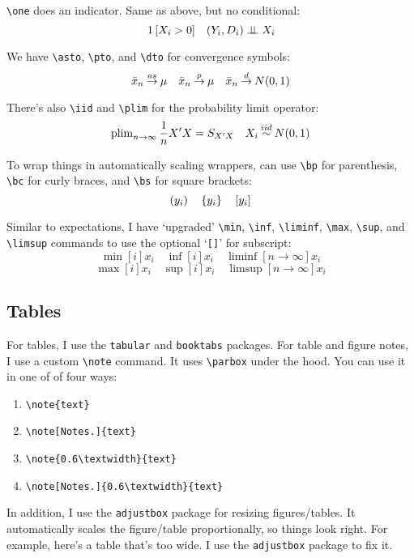\documentclass[12pt]{article}
\begin{document}
\texttt{\textbackslash one} does an indicator. Same as above, but no conditional:
$$\one{X_i > 0} \quad (Y_i, D_i) \indep X_i$$

We have \texttt{\textbackslash asto}, \texttt{\textbackslash pto}, and \texttt{\textbackslash dto} for convergence symbols:
$$\bar{x}_n \mathbin{\overset{as}{\to}} \mu \quad \bar{x}_n \mathbin{\overset{p}{\to}} \mu \quad \bar{x}_n \mathbin{\overset{d}{\to}} N(0, 1)$$

There's also \texttt{\textbackslash iid} and \texttt{\textbackslash plim} for the probability limit operator:
$$\operatorname{plim}_{n\to \infty} \frac{1}{n} X' X = S_{X'X} \quad X_i \mathbin{\overset{iid}{\sim}} N(0, 1)$$

To wrap things in automatically scaling wrappers, can use \texttt{\textbackslash bp} for parenthesis, \texttt{\textbackslash bc} for curly braces, and \texttt{\textbackslash bs} for square brackets:
$$\left( y_i \right) \quad \left\lbrace y_i \right\rbrace \quad \left[ y_i \right]$$

Similar to expectations, I have `upgraded' \texttt{\textbackslash min}, \texttt{\textbackslash inf}, \texttt{\textbackslash liminf}, \texttt{\textbackslash max}, \texttt{\textbackslash sup}, and \texttt{\textbackslash limsup} commands to use the optional `\texttt{[]}' for subscript:
$$\min[i]{x_i} \quad \inf[i]{x_i} \quad \liminf[n \to \infty]{x_i}$$
$$\max[i]{x_i} \quad \sup[i]{x_i} \quad \limsup[n \to \infty]{x_i}$$


\subsection{Tables}

For tables, I use the \texttt{tabular} and \texttt{booktabs} packages. For table and figure notes, I use a custom \texttt{\textbackslash note} command. It uses \texttt{\textbackslash parbox} under the hood. You can use it in one of of four ways:
\begin{enumerate}
  \item \texttt{\textbackslash note\{text\}}
  \item \texttt{\textbackslash note[Notes.]\{text\}}
  \item \texttt{\textbackslash note\{0.6\textbackslash textwidth\}\{text\}}
  \item \texttt{\textbackslash note[Notes.]\{0.6\textbackslash textwidth\}\{text\}}
\end{enumerate}

In addition, I use the \texttt{adjustbox} package for resizing figures/tables. It automatically scales the figure/table proportionally, so things look right. For example, here's a table that's too wide. I use the \texttt{adjustbox} package to fix it.
\end{document}
